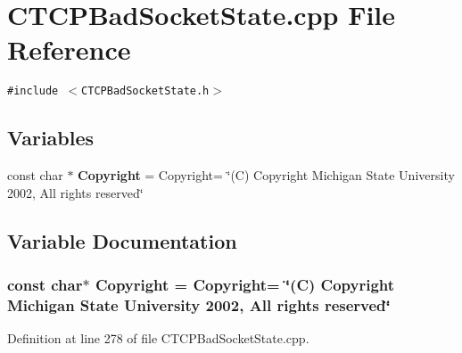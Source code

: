 \section{CTCPBad\-Socket\-State.cpp File Reference}
\label{CTCPBadSocketState_8cpp}
{\tt \#include $<$CTCPBad\-Socket\-State.h$>$}\par
\subsection*{Variables}
\begin{CompactItemize}
\item 
const char $\ast$ {\bf Copyright} = Copyright= \char`\"{}(C) Copyright Michigan State University 2002, All rights reserved\char`\"{}
\end{CompactItemize}


\subsection{Variable Documentation}
\subsubsection{\setlength{\rightskip}{0pt plus 5cm}const char$\ast$ Copyright = Copyright= \char`\"{}(C) Copyright Michigan State University 2002, All rights reserved\char`\"{}\hspace{0.3cm}{\tt  [static]}}\label{CTCPBadSocketState_8cpp_a0}




Definition at line 278 of file CTCPBad\-Socket\-State.cpp.